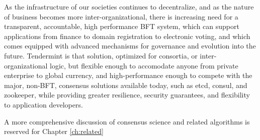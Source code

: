As the infrastructure of our societies continues to decentralize, and as the nature of business becomes more inter-organizational,
there is increasing need for a transparent, accountable, high performance BFT system, which can support applications from finance to domain registration to electronic voting,
and which comes equipped with advanced mechanisms for governance and evolution into the future.
Tendermint is that solution, optimized for consortia, or inter-organizational logic, but flexible enough to accomodate anyone from private enterprise to global currency,
and high-performance enough to compete with the major, non-BFT, consensus solutions available today, such as etcd, consul, and zookeeper, while providing greater resilience, security guarantees, and flexibility to application developers.

A more comprehensive discussion of consensus science and related algorithms is reserved for Chapter \ref{ch:related}

